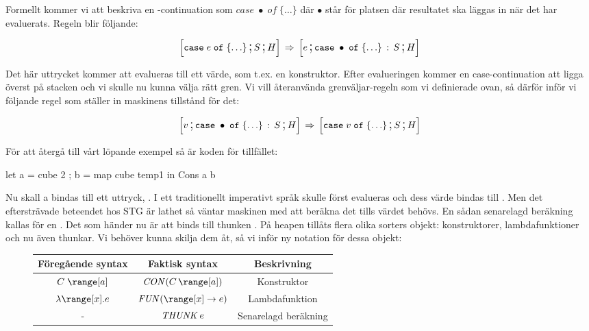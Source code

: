 \documentclass[../Core]{subfiles}
\begin{document}
Formellt kommer vi att beskriva en -continuation som $case\;\bullet\; of\;\{\ldots\}$
där $\bullet$ står för platsen där resultatet ska läggas in när det har evaluerats. Regeln
blir följande:

\[
\text{\large$$}\Big[\mathtt{case}\; e\; \mathtt{of}\;\{\ldots\} \,\text{\Large;}\, S \,\text{\Large;}\, H\Big] \,\Rightarrow\, \text{\large$$}\Big[e \,\text{\Large;}\, \mathtt{case}\;\bullet\; \mathtt{of}\;\{\ldots\} \,:\, S \,\text{\Large;}\,  H\Big]
\]


Det här uttrycket kommer att evalueras till ett värde, som t.ex. en konstruktor.
Efter evalueringen kommer en case-continuation att ligga överst på stacken och vi skulle nu kunna välja
rätt gren. Vi vill återanvända grenväljar-regeln som vi definierade
ovan, så därför inför vi följande regel som ställer in maskinens tillstånd för det:

\[
\text{\large$$}\Big[v \,\text{\Large;}\, \mathtt{case}\;\bullet\; \mathtt{of}\;\{\ldots\} \,:\, S \,\text{\Large;}\, H\Big]\,\Rightarrow\, \text{\large$$}\Big[\mathtt{case}\; v\; \mathtt{of}\;\{\ldots\} \,\text{\Large;}\, S \,\text{\Large;}\, H\Big]
\]


För att återgå till vårt löpande exempel så är koden för tillfället:

\begin{codeEx}
let { a = cube 2
    ; b = map cube temp1
    } in Cons a b
\end{codeEx}

Nu skall a bindas till ett uttryck, . I ett traditionellt imperativt språk skulle
 först evalueras och dess värde bindas till . 
Men det eftersträvade beteendet hos STG är lathet
så väntar maskinen med att beräkna det tills värdet behövs.
En sådan senarelagd beräkning kallas för en . Det som händer nu är att
 binds till thunken . På heapen tillåts flera olika
sorters objekt: konstruktorer, lambdafunktioner och nu även thunkar.
Vi behöver kunna skilja dem åt, så vi inför ny notation för dessa objekt: \\[0.3cm]
\begin{figure}[H]
  \begin{center}
    \begin{tabular}{ccc}
    Föregående syntax & Faktisk syntax & Beskrivning\tabularnewline
    \hline
    $C\;\range[a]$ & $\CON C{\range[a]}$ & Konstruktor\tabularnewline
    $\lambda\range[x].e$ & $\FUN{\range[x]}e$ & Lambdafunktion\tabularnewline
    - & $\text{\emph{THUNK}}\,e$ & Senarelagd beräkning\tabularnewline
    \end{tabular} 
  \end{center} 
\end{figure}%
\end{document}
